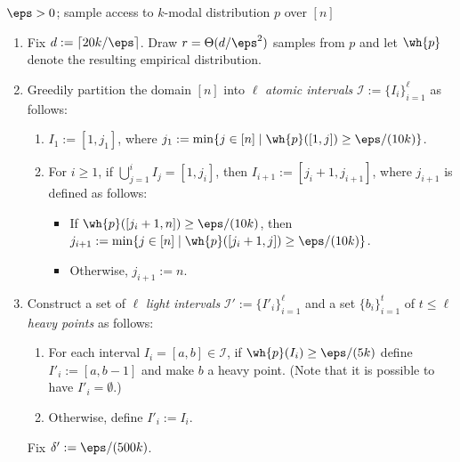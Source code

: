 \begin{algorithm}
\medskip

 $\eps >0$; sample access to $k$-modal
distribution $p$ over $[n]$

%

\begin{enumerate}

\item {Fix $d: = \lceil 20k/\eps \rceil$. Draw $ r = \Theta(d/\eps^2)$} samples
        from $p$ and let $\wh{p}$ denote the resulting empirical distribution.

%


\item Greedily partition the domain $[n]$ into $\ell$ \emph{atomic intervals} $\mathcal{I}:= \{I_i\}_{i=1}^{\ell}$ as follows:
          \begin{enumerate}
          \item[(a)] $I_1 := [1, j_1]$, where $j_1 := \min\{ j \in [n] \mid \wh{p}([1,j]) \geq \eps/(10k)\}$.
           \item[(b)] For $i \geq 1$, if $\bigcup_{j=1}^i I_j = [1, j_i]$, then $I_{i+1}:=[j_i+1, j_{i+1}]$, where
           $j_{i+1}$ is defined as follows: 
           \begin{itemize}
          \item If $\wh{p}([j_i+1, n]) \geq \eps/(10k)$, then $j_{i+1}: = \min\{ j \in [n] \mid \wh{p}([j_{i}+1, j]) \geq \eps/(10k)\}${.}
           \item Otherwise, $j_{i+1} := n$.
           \end{itemize}
           \end{enumerate}

\item Construct a set of $\ell$ \emph{light intervals}  $\mathcal{I'}:= \{I'_i\}_{i=1}^{\ell}$ and a set $\{b_i\}_{i=1}^t$ of $t \leq \ell$ \emph{heavy points} as follows:
          \begin{enumerate}
             \item[(a)] For each interval $I_i = [a,b] \in \mathcal{I}$, if $\wh{p}(I_{{i}}) \geq \eps/(5k)$ define $I'_i:= [a,b-1]$ and make $b$ a heavy point.
                             (Note that it is possible to have $I'_i=\emptyset$.)
             \item[(b)] Otherwise, define $I'_i :=I_i$.
          \end{enumerate}

\smallskip

\noindent Fix $\delta': = {\eps / (500k)}$.


\end{enumerate}
\end{algorithm}
